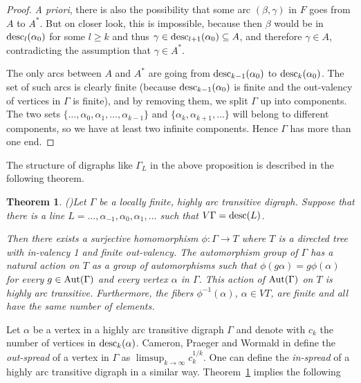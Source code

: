\documentclass{emsprocart}
\newtheorem{theorem}{Theorem}[section]
\theoremstyle{definition}
\begin{document}
\begin{proof}
{\em A priori}, there is also the possibility that some
arc $(\beta,\gamma)$ in
$F$ goes from $A$ to $A^*$.  But on closer look, this is impossible,
because then $\beta$ would be in ${\mbox{${\rm desc}$}}_l(\alpha_0)$ for some
$l\geq k$ and thus $\gamma\in{\mbox{${\rm desc}$}}_{l+1}(\alpha_0)\subseteq A$, and
therefore $\gamma\in A$, contradicting the assumption that $\gamma\in
A^*$.

The only arcs
between $A$ and $A^*$ are going from  ${\mbox{${\rm desc}$}}_{k-1}(\alpha_0)$ to
${\mbox{${\rm desc}$}}_{k}(\alpha_0)$.   The set of such arcs is clearly finite (because
${\mbox{${\rm desc}$}}_{k-1}(\alpha_0)$ is finite and the
out-valency of vertices in $\Gamma$ is
finite), and by removing them,
we split $\Gamma$ up into components.  The two sets
$\{\ldots,\alpha_0,\alpha_1,\ldots,\alpha_{k-1}\}$ and $\{\alpha_k,\alpha_{k+1},\ldots\}$ will
belong to different components, so we have at least two infinite components.
Hence $\Gamma$ has more than
one end.  \end{proof}  

\bigskip

The structure of digraphs like $\Gamma_L$ in the above
proposition is described in the following theorem.

\begin{theorem}
{\rm (\cite[Theorem 1]{Moller2002a})}\label{THATtree}
Let $\Gamma$ be a locally finite, highly arc
transitive digraph. Suppose that there
is a line $L= \ldots, \alpha_{-1}, \alpha_0, \alpha_1,\ldots$
such that $V\Gamma={\mbox{${\rm desc}$}}(L)$.

Then there exists a surjective homomorphism
$\phi:\Gamma\rightarrow T$ where $T$
is a directed tree
with in-valency 1 and finite out-valency.
The automorphism group of $\Gamma$ has a natural action on $T$
as a group of automorphisms such that
$\phi(g\alpha)=g\phi(\alpha)$ for every
$g\in {\mbox{${\rm Aut}(\Gamma)$}}$
and every vertex $\alpha$ in $\Gamma$.
This action of ${\mbox{${\rm Aut}(\Gamma)$}}$ on $T$ is highly arc
transitive. Furthermore, the
fibers  $\phi^{-1}(\alpha)$, $\alpha\in VT$,
are finite and all have the same number
of elements.
\end{theorem}

Let $\alpha$ be a vertex in a highly arc transitive digraph $\Gamma$
and denote with $c_k$ the number of vertices in ${\mbox{${\rm desc}$}}_k(\alpha)$.
Cameron, Praeger and Wormald in \cite[Definition~3.5]{CPW1993}
define the {\em out-spread} of a vertex
in $\Gamma$ as $\limsup_{k\rightarrow\infty} c_k^{1/k}$.   One can
define the {\em in-spread} of a highly arc transitive digraph in
a similar way.   Theorem~\ref{THATtree} implies the following
\end{document}
